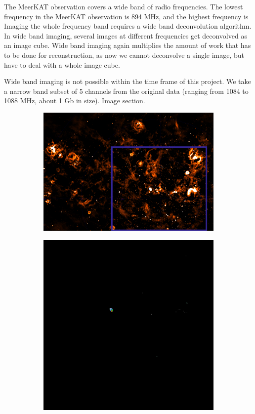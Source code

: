 The MeerKAT observation covers a wide band of radio frequencies. The lowest frequency in the MeerKAT observation is 894 MHz, and the highest frequency is
Imaging the whole frequency band requires a wide band deconvolution algorithm. In wide band imaging, several images at different frequencies get deconvolved as an image cube. Wide band imaging again multiplies the amount of work that has to be done for reconstruction, as now we cannot deconvolve a single image, but have to deal with a whole image cube.

Wide band imaging is not possible within the time frame of this project. We take a narrow band subset of 5 channels from the original data (ranging from 1084 to 1088 MHz, about 1 Gb in size). 
Image section.

\begin{figure}[h]
	\centering
	\begin{subfigure}[b]{0.4\linewidth}
		\includegraphics[width=1.0\linewidth]{./chapters/10.results/LMC/meerkat_cutout.png}
	\end{subfigure}
	\begin{subfigure}[b]{0.30\linewidth}
		\includegraphics[width=1.0\linewidth]{./chapters/10.results/cleancomp/cd.png}

\end{subfigure}
\end{figure}
